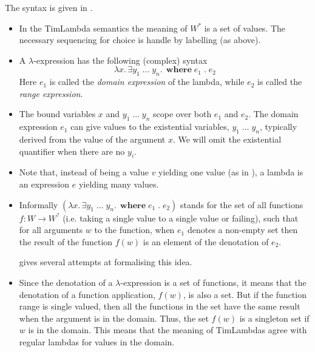 \documentclass[acmsmall,review,dvipsnames]{acmart}
\newcommand{\Varid}[1]{\mathit{#1}}
\newcommand{\Value}{W}
\newcommand{\mtype}{\Value^{*}}
\newcommand{\mtyped}{\Value^{?}}
\begin{document}
The syntax is given in .

\begin{itemize}
\item In the TimLambda semantics the meaning of $\mtype$ is a set of values.
The necessary sequencing for choice is handle by labelling (as above).

\item A $\lambda$-expression has the following (complex) syntax
$$
\ensuremath{\lambda\Varid{x}.\,\exists\Varid{y}_{\mathrm{1}}\;\!\ldots\!\;\Varid{y}_{\Varid{n}}.\,\;\mathbf{where}\;\Varid{e}_{\mathrm{1}}\;\! .\;\Varid{e}_{\mathrm{2}}}
$$
Here \ensuremath{\Varid{e}_{\mathrm{1}}} is called the \emph{domain expression} of the lambda, while \ensuremath{\Varid{e}_{\mathrm{2}}} is called the \emph{range expression}.

\item The bound variables \ensuremath{\Varid{x}} and \ensuremath{\Varid{y}_{\mathrm{1}}\;\!\ldots\!\;\Varid{y}_{\Varid{n}}} scope over both \ensuremath{\Varid{e}_{\mathrm{1}}} and \ensuremath{\Varid{e}_{\mathrm{2}}}.
  The domain expression \ensuremath{\Varid{e}_{\mathrm{1}}} can give values to the existential variables, \ensuremath{\Varid{y}_{\mathrm{1}}\;\!\ldots\!\;\Varid{y}_{\Varid{n}}}, typically
  derived from the value of the argument \ensuremath{\Varid{x}}.
  We will omit the existential quantifier when there are no \ensuremath{\Varid{y}_{\Varid{i}}}.

\item Note that, instead of being a value \ensuremath{\Varid{v}} yielding one value (as in ),
  a lambda is an expression \ensuremath{\Varid{e}} yielding many values.

\item Informally \ensuremath{(\lambda\Varid{x}.\,\exists\Varid{y}_{\mathrm{1}}\;\!\ldots\!\;\Varid{y}_{\Varid{n}}.\,\;\mathbf{where}\;\Varid{e}_{\mathrm{1}}\;\! .\;\Varid{e}_{\mathrm{2}})}
  stands for the set of all functions $f : \Value \rightarrow \mtyped$ (i.e. taking a single value to a single value or failing),
  such that for all arguments $w$ to the function,
  when \ensuremath{\Varid{e}_{\mathrm{1}}} denotes a non-empty set then the result of the function $f(w)$ is an element of the denotation of \ensuremath{\Varid{e}_{\mathrm{2}}}.

   gives several attempts at formalising this idea.

\item Since the denotation of a $\lambda$-expression is a set of functions, it means that the denotation
  of a function application, $f(w)$, is also a set.  But if the function range is single valued, then all
  the functions in the set have the same result when the argument is in the domain.
  Thus, the set $f(w)$ is a singleton set if $w$ is in the domain.
  This means that the meaning of TimLambdas agree with regular lambdas for values in the domain.

\end{itemize}
\end{document}
